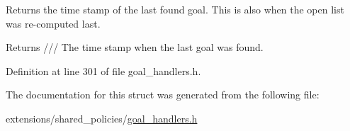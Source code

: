 Returns the time stamp of the last found goal. This is also when the open list was re-\/computed last. 

\begin{DoxyReturn}{Returns}
/// The time stamp when the last goal was found. 
\end{DoxyReturn}


Definition at line 301 of file goal\+\_\+handlers.\+h.



The documentation for this struct was generated from the following file\+:\begin{DoxyCompactItemize}
\item 
extensions/shared\+\_\+policies/\hyperlink{goal__handlers_8h}{goal\+\_\+handlers.\+h}\end{DoxyCompactItemize}
